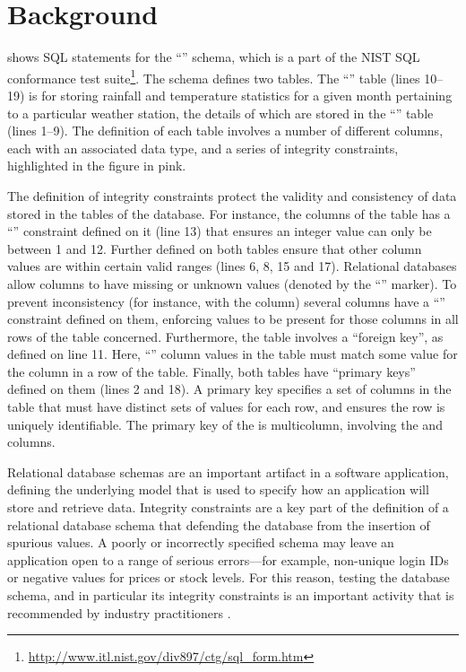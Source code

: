 
\section{Background}
\label{sec:background}



 shows SQL  statements for the ``\NistWeather'' schema, which is a part of the NIST SQL conformance test suite\footnote{\url{http://www.itl.nist.gov/div897/ctg/sql_form.htm}}. The schema defines two tables. The ``'' table (lines 10--19) is for storing rainfall and temperature statistics for a given month pertaining to a particular weather station, the details of which are stored in the ``'' table (lines 1--9). The definition of each table involves a number of different columns, each with an associated data type, and a series of integrity constraints, highlighted in the figure in pink. 

The definition of integrity constraints protect the validity and consistency of data stored in the tables of the database. For instance, the  columns of the  table has a ``\CHECK'' constraint defined on it (line 13) that ensures an integer  value can only be between 1 and 12. Further \CCs defined on both tables ensure that other column values are within certain valid ranges (lines 6, 8, 15 and 17). Relational databases allow columns to have missing or unknown values (denoted by the ``\NULL'' marker). To prevent inconsistency (for instance, with the  column) several columns have a ``\NOTNULL'' constraint defined on them, enforcing values to be present for those columns in all rows of the table concerned.
Furthermore, the  table involves a ``foreign key'', as defined on line 11. Here, ``'' column values in the  table must match some value 
for the  column in a row of the  table. Finally, both tables have ``primary keys'' defined on them (lines 2 and 18). A primary key specifies a set of columns in the table that must have distinct sets of values for each row, and ensures the row is uniquely identifiable. 
The primary key of the  is multicolumn, involving the  and  columns.

Relational database schemas are an important artifact in a software application, defining the underlying model that is used to specify how an application will store and retrieve data. Integrity constraints are a key part of the definition of a relational database schema that defending the database from the insertion of spurious values. A poorly or incorrectly specified schema may leave an application open to a range of serious errors---for example, non-unique login IDs or negative values for prices or stock levels. For this reason, testing the database schema, and in particular its integrity constraints is an important activity that is recommended by industry practitioners \cite{DzoneDatabaseTesting}.

